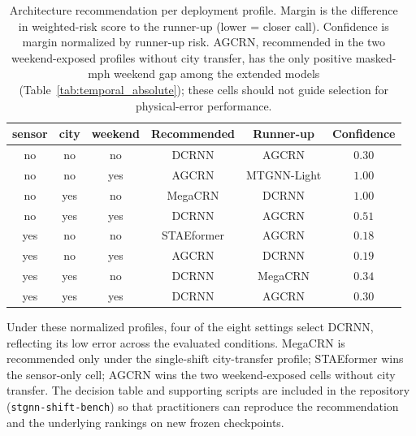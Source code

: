\begin{table}[h]
\centering
\caption{Architecture recommendation per deployment profile. Margin is the
difference in weighted-risk score to the runner-up (lower = closer call).
Confidence is margin normalized by runner-up risk. AGCRN, recommended in the
two weekend-exposed profiles without city transfer, has the only positive
masked-mph weekend gap among the extended models (Table~\ref{tab:temporal_absolute});
these cells should not guide selection for physical-error performance.}
\label{tab:decision_tree}
\vskip 0.05in
\small
\begin{tabular}{cccccc}
\toprule
\textbf{sensor} & \textbf{city} & \textbf{weekend} & \textbf{Recommended} & \textbf{Runner-up} & \textbf{Confidence} \\
\midrule
no  & no  & no  & DCRNN      & AGCRN      & $0.30$ \\
no  & no  & yes & AGCRN      & MTGNN-Light& $1.00$ \\
no  & yes & no  & MegaCRN    & DCRNN      & $1.00$ \\
no  & yes & yes & DCRNN      & AGCRN      & $0.51$ \\
yes & no  & no  & STAEformer & AGCRN      & $0.18$ \\
yes & no  & yes & AGCRN      & DCRNN      & $0.19$ \\
yes & yes & no  & DCRNN      & MegaCRN    & $0.34$ \\
yes & yes & yes & DCRNN      & AGCRN      & $0.30$ \\
\bottomrule
\end{tabular}
\end{table}

Under these normalized profiles, four of the eight settings select DCRNN, reflecting its
low error across the evaluated conditions. MegaCRN is recommended only under the
single-shift city-transfer profile; STAEformer wins the sensor-only cell;
AGCRN wins the two weekend-exposed cells without city transfer. The decision table and supporting scripts are included in the repository
(\texttt{stgnn-shift-bench}) so that practitioners can reproduce the recommendation
and the underlying rankings on new frozen checkpoints.
